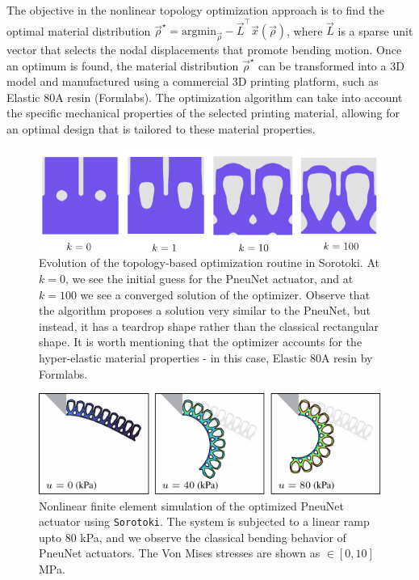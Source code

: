 The objective in the nonlinear topology optimization approach is to find the optimal material distribution $\vec{\rho}^\star = \textrm{argmin}_{\vec{\rho}}  -\vec{L}^\top \vec{x}(\vec{\rho})$, where $\vec{L}$ is a sparse unit vector that selects the nodal displacements that promote bending motion. Once an optimum is found, the material distribution $\vec{\rho}^\star$ can be transformed into a 3D model and manufactured using a commercial 3D printing platform, such as Elastic 80A resin (Formlabs). The optimization algorithm can take into account the specific mechanical properties of the selected printing material, allowing for an optimal design that is tailored to these material properties.
%
\begin{figure}[!t]
    \vspace{-2mm}
    \centering
    \includegraphics*[width=.95\textwidth]{./pdf/thesis-figure-6-22.pdf}
    \caption{Evolution of the topology-based optimization routine in Sorotoki. At $k=0$, we see the initial guess for the PneuNet actuator, and at $k=100$ we see a converged solution of the optimizer. Observe that the algorithm proposes a solution very similar to the PneuNet, but instead, it has a teardrop shape rather than the classical rectangular shape. It is worth mentioning that the optimizer accounts for the hyper-elastic material properties - in this case, Elastic 80A resin by Formlabs.}
    \label{fig:C5:fig_optpneunet_solutions}
    \vspace{-3mm}
\end{figure}

\begin{figure}[!t]
    \centering
    \includegraphics*[width=.95\textwidth]{./pdf/thesis-figure-6-23.pdf}
    \caption{Nonlinear finite element simulation of the optimized PneuNet actuator using \texttt{Sorotoki}. The system is subjected to a linear ramp upto 80 \si{\kilo \pascal}, and we observe the classical bending behavior of PneuNet actuators. The Von Mises stresses are shown as \protect{}$\!\!\in [0,10]$ \si{\mega \pascal}. }
    \label{fig:C5:fig_optpneunet_fem}
    \vspace{-3mm}
\end{figure}
%

